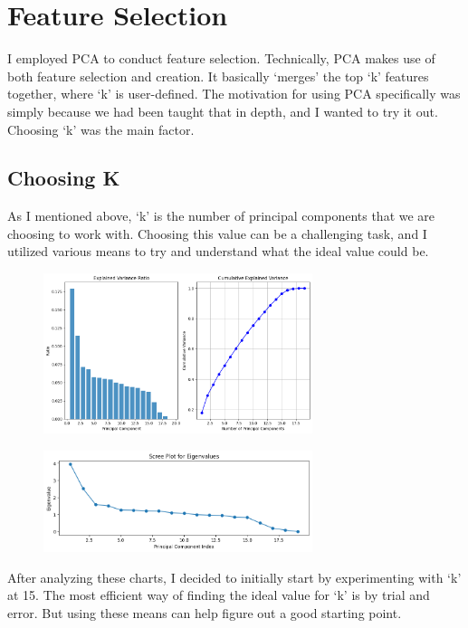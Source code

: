 \section{Feature Selection } 
I employed PCA to conduct feature selection. Technically, PCA makes use of both feature selection and creation. It basically ‘merges’ the top ‘k’ features together, where ‘k’ is user-defined. 
The motivation for using PCA specifically was simply because we had been taught that in depth, and I wanted to try it out. Choosing ‘k’ was the main factor.



\subsection{Choosing K}
As I mentioned above, ‘k’ is the number of principal components that we are choosing to work with. Choosing this value can be a challenging task, and I utilized various means to try and understand what the ideal value could be.

\begin{figure}[h]
    \centering
    \includegraphics[width=0.7\textwidth]{Chapters/ch2/ch2_vr_er_1.png}
\end{figure}
\begin{figure}[h]
    \centering
    \includegraphics[width=0.7\textwidth]{Chapters/ch2/ch_2_screeplot_1.png}
\end{figure}
\newpage
After analyzing these charts, I decided to initially start by experimenting with ‘k’ at 15. The most efficient way of finding the ideal value for ‘k’ is by trial and error. But using these means can help figure out a good starting point.


